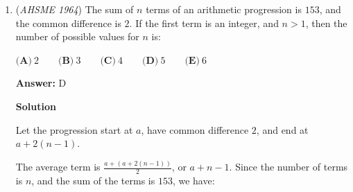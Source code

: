 \begin{enumerate}
 $\textbf{(A)}\ 0<a<.01\qquad \textbf{(B)}\ .01<a<1 \qquad \textbf{(C)}\ 0<a<1\qquad \\ \textbf{(D)}\ 0<a \le 1\qquad \textbf{(E)}\ a>1$

 \textbf{Answer: }E



\textbf{Solution 1}

Note that $|x-4| = |-(x-4)| = |4-x|$.  

 By the triangle inequality, $|x-4| + |x-3| = |4-x| + |x-3| \geq |(4-x)+(x-3)| = 1$.  Therefore, $\boxed{\textbf{(E)}\ a>1}$.

 



\textbf{Solution 2}

Let $A$, $B$, and $X$ be at $3$, $4$, and $x$ on a number line.  Then $|x-4| + |x-3| = AX + BX$.  

 If $3 \leq x \leq 4$, then $X \in \overline{AB}$, so $AX + BX = AB = 1$.  

 If $x < 3$, then $X$ is to the left of $A$, so $AX + BX = AX + (AX + AB) = 2AX + 1 > 1$.  

 If $x > 4$, then $X$ is to the right of $B$, so $AX + BX = (AB + BX) + BX = 2BX + 1 > 1$.

 So $1 \leq AX + BX < a$ for all $x$, and thus $\boxed{\textbf{(E)}\ a > 1}$ is the correct choice.

 



\textbf{Solution 3 (Answer Choices)}

If $x = 5$, then $a > |x-4|+|x-3|=3$.  Of the choices, only $\boxed{\textbf{(E)}\ a>1}$ is satisfied by $a=3$.

 


	\item (\textit{AHSME 1964}) The sum of $n$ terms of an arithmetic progression is $153$, and the common difference is $2$. 
If the first term is an integer, and $n>1$, then the number of possible values for $n$ is:


 $\textbf{(A)}\ 2\qquad \textbf{(B)}\ 3\qquad \textbf{(C)}\ 4\qquad \textbf{(D)}\ 5\qquad \textbf{(E)}\ 6$

 \textbf{Answer: }D



\textbf{Solution}

Let the progression start at $a$, have common difference $2$, and end at $a + 2(n-1)$.

 
The average term is $\frac{a + (a + 2(n-1))}{2}$, or $a + n - 1$.  Since the number of terms is $n$, and the sum of the terms is $153$, we have:


\end{enumerate}

